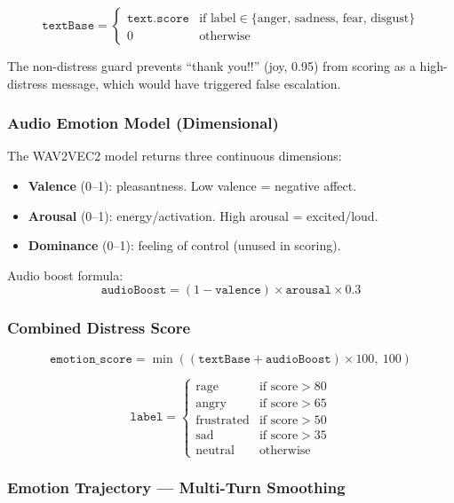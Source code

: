 \documentclass[12pt,a4paper]{article}
\begin{document}
\[
\texttt{textBase} = \begin{cases} \texttt{text.score} & \text{if label} \in \{\text{anger, sadness, fear, disgust}\} \\ 0 & \text{otherwise} \end{cases}
\]

The non-distress guard prevents ``thank you!!'' (joy, 0.95) from scoring as a
high-distress message, which would have triggered false escalation.

\subsubsection{Audio Emotion Model (Dimensional)}

The WAV2VEC2 model returns three continuous dimensions:
\begin{itemize}[noitemsep]
  \item \textbf{Valence} (0–1): pleasantness. Low valence = negative affect.
  \item \textbf{Arousal} (0–1): energy/activation. High arousal = excited/loud.
  \item \textbf{Dominance} (0–1): feeling of control (unused in scoring).
\end{itemize}

Audio boost formula:
\[
\texttt{audioBoost} = (1 - \texttt{valence}) \times \texttt{arousal} \times 0.3
\]

\subsubsection{Combined Distress Score}

\[
\texttt{emotion\_score} = \min\!\left((\texttt{textBase} + \texttt{audioBoost}) \times 100,\ 100\right)
\]

\[
\texttt{label} = \begin{cases}
  \text{rage} & \text{if score} > 80 \\
  \text{angry} & \text{if score} > 65 \\
  \text{frustrated} & \text{if score} > 50 \\
  \text{sad} & \text{if score} > 35 \\
  \text{neutral} & \text{otherwise}
\end{cases}
\]

\subsubsection{Emotion Trajectory — Multi-Turn Smoothing}
\end{document}

